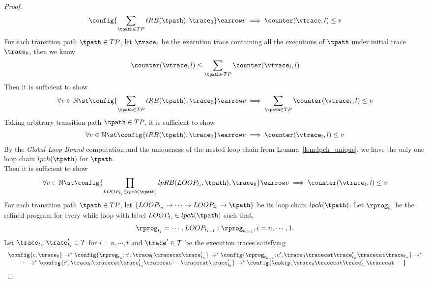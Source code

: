 \begin{proof}
\[          \config{\sum\limits_{\tpath \in TP} tRB(\tpath), \trace_0
          } \earrow v \implies  \counter(\vtrace, l) \leq v
          \]
          For each transition path $\tpath \in TP$, let $\trace_t$ be the execution trace 
          containing all the executions of $\tpath$
          under initial trace $\trace_0$, then we know 
          \[
            \counter(\vtrace, l) \leq \sum_{\tpath \in TP} \counter(\vtrace_t, l) 
          \]
          Then it is sufficient to show 
          \[
          \forall v \in \mathbb{N} \st 
          \config{\sum\limits_{\tpath \in TP} tRB(\tpath), \trace_0
          } \earrow v \implies \sum_{\tpath \in TP} \counter(\vtrace_t, l) \leq v
          \]
          Taking arbitrary transition path $\tpath \in TP$, it is sufficient to show 
          \[
            \forall v \in \mathbb{N} \st 
            \config{tRB(\tpath), \trace_0
            } \earrow v \implies \counter(\vtrace_t, l) \leq v
            \]
          By the \emph{Global Loop Bound} computation and the uniqueness of the 
          nested loop chain from Lemma~\ref{lem:lpch_unique}, 
          we have the only one loop chain $lpch(\tpath)$ for $\tpath$.
          \\
          Then it is sufficient to show 
          \[
            \forall v \in \mathbb{N} \st 
          \config{\prod_{LOOP_{t_i} \in lpch(\tpath)} lpRB(LOOP_{t_i}, \tpath), \trace_0
          } \earrow v \implies  \counter(\vtrace_t, l) \leq v
        \]
        For each transition path $\tpath \in TP$, 
        let $\{LOOP_{t_n} \to \cdots \to LOOP_{t_0} \to \tpath\}$
        be its loop chain $lpch(\tpath)$. 
        Let $\rprog_{t_i}$ be the refined program for every while loop 
        with label $LOOP_{t_i} \in lpch(\tpath)$ such that,
        \[
          \rprog_{t_{i}} = \cdots, LOOP_{t_{i - 1}}:\rprog_{t_{i - 1}}, i = n, \cdots, {1}.
        \] 
        Let $\trace_{t_i}, \trace_{t_i}' \in \mathcal{T}$ for $i = n, \cdots, t$ and $\trace' \in \mathcal{T}$ be the execution traces satisfying
        \[
          \begin{array}{l}
          \config{c, \trace_0} \to^{*} \config{\rprog_{t_n};c', \trace_0 \tracecat \trace_{t_n}'}
        \to^{*} \config{\rprog_{t_{n - 1}};c', \trace_0 \tracecat \trace_{t_n}' \tracecat \trace_{t_n}}
        \to^{*} 
        \\ \qquad 
        \cdots \to^{*} \config{c', \trace_0 \tracecat \trace_{t_n}' \tracecat \cdots \tracecat
        \trace_{t_0}'} \to^{*} \config{\eskip, \trace_0 \tracecat \trace_{t_n}' \tracecat \cdots 
}
\end{array}\]
\end{proof}
